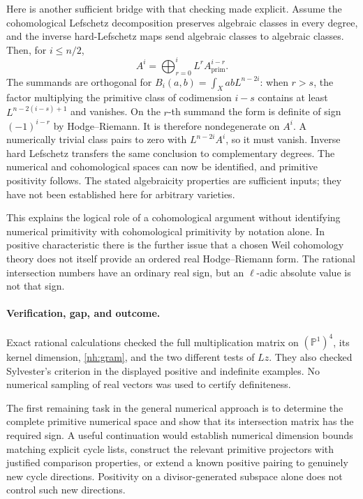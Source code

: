 \documentclass[11pt]{article}
\begin{document}
Here is another sufficient bridge with that checking made explicit.
Assume the cohomological Lefschetz decomposition preserves algebraic
classes in every degree, and the inverse hard-Lefschetz maps send
algebraic classes to algebraic classes. Then, for $i\le n/2$,
\[
 A^i=\bigoplus_{r=0}^i L^r A^{i-r}_{\mathrm{prim}}.
\]
The summands are orthogonal for
$B_i(a,b)=\int_X abL^{n-2i}$: when $r>s$, the factor multiplying
the primitive class of codimension $i-s$ contains at least
$L^{n-2(i-s)+1}$ and vanishes. On the $r$-th summand the form is
definite of sign $(-1)^{i-r}$ by Hodge--Riemann. It is therefore
nondegenerate on $A^i$. A numerically trivial class pairs to zero
with $L^{n-2i}A^i$, so it must vanish. Inverse hard Lefschetz transfers
the same conclusion to complementary degrees. The numerical and
cohomological spaces can now be identified, and primitive positivity
follows. The stated algebraicity properties are sufficient inputs;
they have not been established here for arbitrary varieties.

This explains the logical role of a cohomological argument without
identifying numerical primitivity with cohomological primitivity by
notation alone. In positive characteristic there is the further issue
that a chosen Weil cohomology theory does not itself provide an ordered
real Hodge--Riemann form. The rational intersection numbers have an
ordinary real sign, but an $\ell$-adic absolute value is not that sign.

\paragraph{Verification, gap, and outcome.}
Exact rational calculations checked the full multiplication matrix on
$(\mathbb P^1)^4$, its kernel dimension, \eqref{nh:gram}, and the two
different tests of $Lz$. They also checked Sylvester's criterion in the
displayed positive and indefinite examples. No numerical sampling of
real vectors was used to certify definiteness.

The first remaining task in the general numerical approach is to
determine the complete primitive numerical space and show that its
intersection matrix has the required sign. A useful continuation would
establish numerical dimension bounds matching explicit cycle lists,
construct the relevant primitive projectors with justified comparison
properties, or extend a known positive pairing to genuinely new cycle
directions. Positivity on a divisor-generated subspace alone does not
control such new directions.
\end{document}
